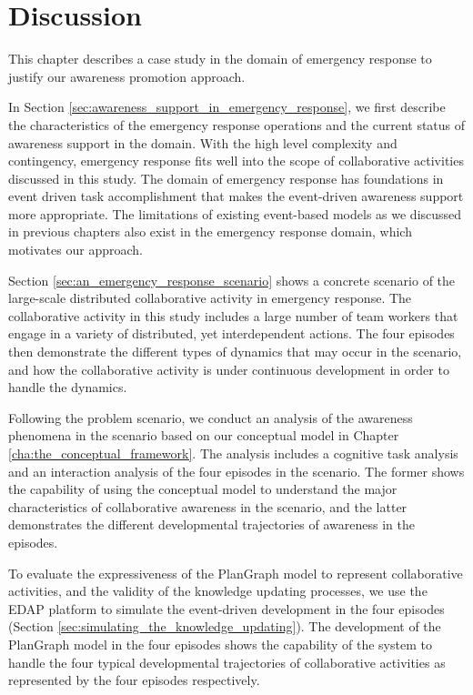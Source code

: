 \section{Discussion} %
\label{sec:summary_and_discussion}
This chapter describes a case study in the domain of emergency response to justify our awareness promotion approach. 

In Section \ref{sec:awareness_support_in_emergency_response}, we first describe the characteristics of the emergency response operations and the current status of awareness support in the domain. With the high level complexity and contingency, emergency response fits well into the scope of collaborative activities discussed in this study. The domain of emergency response has foundations in event driven task accomplishment that makes the event-driven awareness support more appropriate. The limitations of existing event-based models as we discussed in previous chapters also exist in the emergency response domain, which motivates our approach.

Section \ref{sec:an_emergency_response_scenario} shows a concrete scenario of the large-scale distributed collaborative activity in emergency response. The collaborative activity in this study includes a large number of team workers that engage in a variety of distributed, yet interdependent actions. The four episodes then demonstrate the different types of dynamics that may occur in the scenario, and how the collaborative activity is under continuous development in order to handle the dynamics.

Following the problem scenario, we conduct an analysis of the awareness phenomena in the scenario based on our conceptual model in Chapter \ref{cha:the_conceptual_framework}. The analysis includes a cognitive task analysis and an interaction analysis of the four episodes in the scenario. The former shows the capability of using the conceptual model to understand the major characteristics of collaborative awareness in the scenario, and the latter demonstrates the different developmental trajectories of awareness in the episodes.

To evaluate the expressiveness of the PlanGraph model to represent collaborative activities, and the validity of the knowledge updating processes, we use the EDAP platform to simulate the event-driven development in the four episodes (Section \ref{sec:simulating_the_knowledge_updating}). The development of the PlanGraph model in the four episodes shows the capability of the system to handle the four typical developmental trajectories of collaborative activities as represented by the four episodes respectively. 

